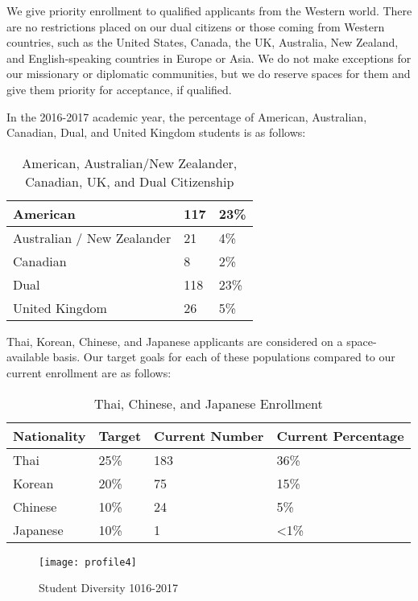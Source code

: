 We give priority enrollment to qualified applicants from the Western world.  There are no restrictions placed on our dual citizens or those coming from Western countries, such as the United States, Canada, the UK, Australia, New Zealand, and English-speaking countries in Europe or Asia.  We do not make exceptions for our missionary or diplomatic communities, but we do reserve spaces for them and give them priority for acceptance, if qualified.  

In the 2016-2017 academic year, the percentage of American, Australian, Canadian, Dual, and United Kingdom students is as follows:

\begin{table}[h]
\caption{American, Australian/New Zealander, Canadian, UK, and Dual Citizenship}
\label{table:3}
\begin{tabu}{|X[2]|X|X|}
\hline
American & 117 & 23\% \\
\hline
Australian / New Zealander & 21  & 4\% \\
\hline
Canadian & 8 & 2\% \\
\hline
Dual & 118 & 23\% \\
\hline
United Kingdom & 26 & 5\% \\
\hline
\end{tabu}
\end{table}

Thai, Korean, Chinese, and Japanese applicants are considered on a space-available basis.  Our target goals for each of these populations compared to our current enrollment are as follows:

\begin{table}
\caption{Thai, Chinese, and Japanese Enrollment}
\label{table:4}
\begin{tabu}{|X[2]|X|X|X|}
\hline
Nationality &
Target &
Current Number &
Current Percentage \\
\hline
Thai &
25\% &
183 &
36\% \\
\hline
Korean &
20\% &
75 &
15\% \\
\hline
Chinese &
10\% &
24 &
5\% \\
\hline
Japanese &
10\% &
1 &
<1\% \\
\hline
\end{tabu} 
\end{table}

\begin{figure}
\centering
\texttt{[image: profile4]}
\caption{Student Diversity 1016-2017}
\end{figure}

